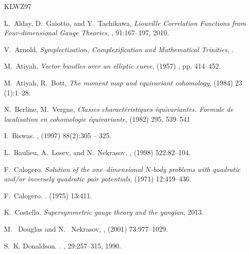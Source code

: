 \documentclass[12pt]{article}
\numberwithin{equation}{section}
\theoremstyle{definition}
\begin{document}
\newpage
\newcommand{\etalchar}[1]{$^{#1}$}
\begin{thebibliography}{KLWZ97}

L.~Alday, D.~Gaiotto, and Y.~Tachikawa, 
\emph{Liouville Correlation Functions from Four-dimensional Gauge
  Theories},
, 91:167--197, 2010.

V.~Arnold, 
\emph{Symplectization, Complexification and Mathematical Trinities}, 
.

M.~Atiyah, 
\emph{Vector bundles over an elliptic curve}, 
 (1957) , pp. 414--452.

M.~Atiyah, R.~Bott, 
\emph{The moment map and equivariant cohomology}, 
 (1984) 23 (1):1--28.

N.~Berline, M.~Vergne, 
\emph{Classes charact{\'e}ristiques {\'e}quivariantes. Formule de localisation en
  cohomologie {\'e}quivariante}, 
 (1982) 295, 539--541

I.~Biswas.
, 
 (1997) 88(2):305 -- 325.

L.~Baulieu, A.~Losev, and N.~Nekrasov, 
, 
 (1998) 522:82--104.

F.~Calogero.
\emph{Solution of the one--dimensional $N$-body problems with quadratic
  and/or inversely quadratic pair potentials}, 
 (1971) 12:419--436.

F.~Calogero.
.
 (1975) 13:411.

K.~Costello.
\emph{Supersymmetric gauge theory and the yangian}, 2013.

M.~ Douglas and N.~ Nekrasov, 
, 
(2001) 73:977--1029.

S.~K. Donaldson.
.
, 29:257--315, 1990.


\end{thebibliography}
\end{document}
